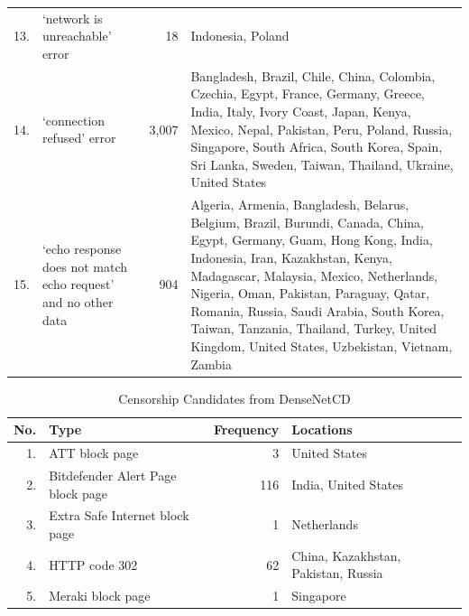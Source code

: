 \begin{table}
{\begin{tabular}{r p{} r p{}}
		13. & `network is unreachable' error & 18  & Indonesia, Poland \\
		14. & `connection refused' error & 3,007 & Bangladesh, Brazil, Chile, China, Colombia, Czechia, Egypt, France, Germany, Greece, India, Italy, Ivory Coast, Japan, Kenya, Mexico, Nepal, Pakistan, Peru, Poland, Russia, Singapore, South Africa, South Korea, Spain, Sri Lanka, Sweden, Taiwan, Thailand, Ukraine, United States \\
		15. & `echo response does not match echo request' and no other data & 904 & Algeria, Armenia, Bangladesh, Belarus, Belgium, Brazil, Burundi, Canada, China, Egypt, Germany, Guam, Hong Kong, India, Indonesia, Iran, Kazakhstan, Kenya, Madagascar, Malaysia, Mexico, Netherlands, Nigeria, Oman, Pakistan, Paraguay, Qatar, Romania, Russia, Saudi Arabia, South Korea, Taiwan, Tanzania, Thailand, Turkey, United Kingdom, United States, Uzbekistan, Vietnam, Zambia \\
  \bottomrule
\end{tabular}
	}
\end{table}

\begin{table}
	\centering
  \caption{Censorship Candidates from DenseNetCD}
  \label{tab:dn_results}
	{\footnotesize
	\begin{tabular}{r p{} r p{}}
    \toprule
		No. & Type & Frequency & Locations\\
    \midrule
		1. & ATT block page & 3 & United States \\
		2. & Bitdefender Alert Page block page & 116 & India, United States \\
		3. & Extra Safe Internet block page & 1 & Netherlands \\
		4. & HTTP code 302 & 62 & China, Kazakhstan, Pakistan, Russia \\
		5. & Meraki block page & 1 & Singapore \\
  \bottomrule
\end{tabular}
		}
\end{table}

